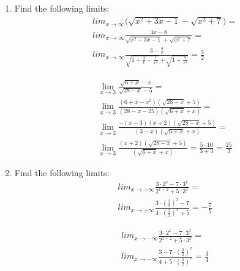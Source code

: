 \documentclass{article}
\begin{document}
\begin{enumerate}
\item Find the following limits:
\begin{align*}
&lim_{x \to \infty} \bigg(\sqrt{x^2 + 3x - 1} - \sqrt{x^2 + 7}\bigg) =\\
&lim_{x \to \infty} \frac{3x - 8}{\sqrt{x^2 + 3x - 1} + \sqrt{x^2 + 7}} =\\
&lim_{x \to \infty} \frac{3 - \frac{8}{x}}{\sqrt{1 + \frac{3}{x} - \frac{1}{x^2}} + \sqrt{1 + \frac{7}{x^2}}} = \frac{3}{2}
\end{align*}

\begin{align*}
&\lim_{x \to 3} \frac{\sqrt{6+x} - x}{\sqrt{28 - x} - 5} =\\
&\lim_{x \to 3} \frac{(6 + x - x^2)(\sqrt{28-x} + 5)}{(28 - x - 25)(\sqrt{6 + x} + x)} =\\
&\lim_{x \to 3} \frac{-(x - 3)(x + 2)(\sqrt{28-x} + 5)}{(3 - x)(\sqrt{6 + x} + x)} =\\
&\lim_{x \to 3} \frac{(x + 2)(\sqrt{28-x} + 5)}{(\sqrt{6 + x} + x)} = \frac{5 \cdot 10}{3 + 3} = \frac{25}{3}
\end{align*}

\item Find the following limits:
\begin{align*}
&lim_{x \to +\infty} \frac{3 \cdot 2^x - 7 \cdot 3^x}{2^{x + 2} + 5 \cdot 3^x} =\\
&lim_{x \to +\infty} \frac{3 \cdot (\frac{2}{3})^x - 7}{4 \cdot (\frac{2}{3})^x + 5} = -\frac{7}{5}
\end{align*}

\begin{align*}
&lim_{x \to -\infty} \frac{3 \cdot 2^x - 7 \cdot 3^x}{2^{x + 2} + 5 \cdot 3^x} =\\
&lim_{x \to -\infty} \frac{3 - 7 \cdot (\frac{3}{2})^x}{4 + 5 \cdot (\frac{3}{2})^x} = \frac{3}{4}
\end{align*}

\end{enumerate}
\end{document}
